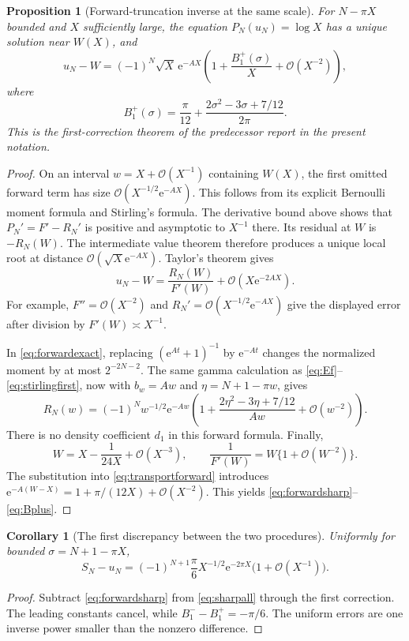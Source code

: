 \documentclass[11pt,a4paper]{article}
\newtheorem{proposition}[proposition]{Proposition}
\newtheorem{corollary}[corollary]{Corollary}
\theoremstyle{definition}
\numberwithin{equation}{section}
\newcommand{\ee}{\mathrm{e}}
\newcommand{\Oh}{\mathcal O}
\begin{document}
\begin{proposition}[Forward-truncation inverse at the same scale]
\label{prop:forwardsharp}
For $N-\pi X$ bounded and $X$ sufficiently large, the equation
$P_N(u_N)=\log X$ has a unique solution near $W(X)$, and
\begin{equation}
 u_N-W=(-1)^N\sqrt X\,\ee^{-AX}
 \left(1+\frac{B_1^+(\sigma)}X+\Oh(X^{-2})\right),
 \label{eq:forwardsharp}
\end{equation}
where
\begin{equation}
 B_1^+(\sigma)=\frac\pi{12}
       +\frac{2\sigma^2-3\sigma+7/12}{2\pi}.
 \label{eq:Bplus}
\end{equation}
This is the first-correction theorem of the predecessor report
\cite{prior} in the present notation.
\end{proposition}
\begin{proof}
On an interval $w=X+\Oh(X^{-1})$ containing $W(X)$, the first omitted
forward term has size $\Oh(X^{-1/2}\ee^{-AX})$. This follows from its
explicit Bernoulli moment formula and Stirling's formula. The derivative
bound above shows that $P_N'=F'-R_N'$ is positive and asymptotic to
$X^{-1}$ there. Its residual at $W$ is $-R_N(W)$. The intermediate value
theorem therefore produces a unique local root at distance
$\Oh(\sqrt X\ee^{-AX})$. Taylor's theorem gives
\begin{equation}
 u_N-W=\frac{R_N(W)}{F'(W)}+\Oh(X\ee^{-2AX}).
 \label{eq:transportforward}
\end{equation}
For example, $F''=\Oh(X^{-2})$ and
$R_N'=\Oh(X^{-1/2}\ee^{-AX})$ give the displayed error after division
by $F'(W)\asymp X^{-1}$.

In \eqref{eq:forwardexact}, replacing $(\ee^{At}+1)^{-1}$ by
$\ee^{-At}$ changes the normalized moment by at most $2^{-2N-2}$.
The same gamma calculation as \eqref{eq:Ef}--\eqref{eq:stirlingfirst},
now with $b_w=Aw$ and $\eta=N+1-\pi w$, gives
\[
 R_N(w)=(-1)^Nw^{-1/2}\ee^{-Aw}
 \left(1+\frac{2\eta^2-3\eta+7/12}{Aw}+\Oh(w^{-2})\right).
\]
There is no density coefficient $d_1$ in this forward formula.
Finally,
\[
 W=X-\frac1{24X}+\Oh(X^{-3}),\qquad
 \frac1{F'(W)}=W\{1+\Oh(W^{-2})\}.
\]
The substitution into \eqref{eq:transportforward} introduces
$\ee^{-A(W-X)}=1+\pi/(12X)+\Oh(X^{-2})$.
This yields \eqref{eq:forwardsharp}--\eqref{eq:Bplus}.
\end{proof}

\begin{corollary}[The first discrepancy between the two procedures]
\label{cor:comparison}
Uniformly for bounded $\sigma=N+1-\pi X$,
\begin{equation}
 S_N-u_N=(-1)^{N+1}\frac\pi6 X^{-1/2}\ee^{-2\pi X}
                  \bigl(1+\Oh(X^{-1})\bigr).
 \label{eq:comparison}
\end{equation}
\end{corollary}
\begin{proof}
Subtract \eqref{eq:forwardsharp} from \eqref{eq:sharpall} through the
first correction. The leading constants cancel, while
$B_1^--B_1^+=-\pi/6$. The uniform errors are one inverse power smaller
than the nonzero difference.
\end{proof}
\end{document}
